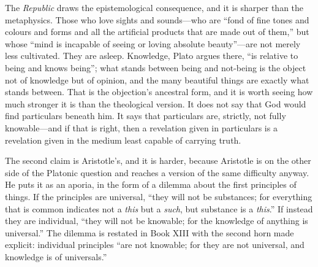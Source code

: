 The \emph{Republic} draws the epistemological consequence, and it is sharper than the metaphysics. Those who love sights and sounds---who are ``fond of fine tones and colours and forms and all the artificial products that are made out of them,'' but whose ``mind is incapable of seeing or loving absolute beauty''---are not merely less cultivated. They are asleep. Knowledge, Plato argues there, ``is relative to being and knows being''; what stands between being and not-being is the object not of knowledge but of opinion, and the many beautiful things are exactly what stands between. That is the objection's ancestral form, and it is worth seeing how much stronger it is than the theological version. It does not say that God would find particulars beneath him. It says that particulars are, strictly, not fully knowable---and if that is right, then a revelation given in particulars is a revelation given in the medium least capable of carrying truth.

The second claim is Aristotle's, and it is harder, because Aristotle is on the other side of the Platonic question and reaches a version of the same difficulty anyway. He puts it as an aporia, in the form of a dilemma about the first principles of things. If the principles are universal, ``they will not be substances; for everything that is common indicates not a \emph{this} but a \emph{such}, but substance is a \emph{this}.'' If instead they are individual, ``they will not be knowable; for the knowledge of anything is universal.'' The dilemma is restated in Book XIII with the second horn made explicit: individual principles ``are not knowable; for they are not universal, and knowledge is of universals.''

